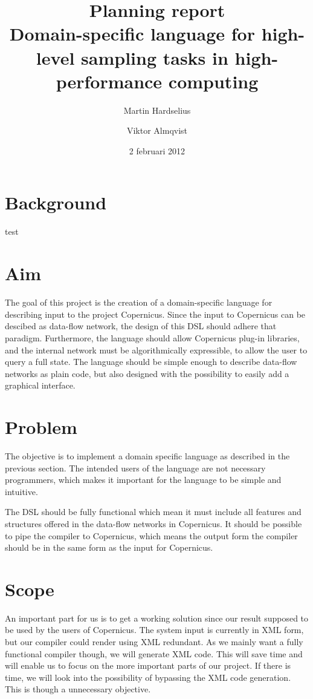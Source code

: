 \documentclass[a4paper]{article}
\title{Planning report\\
  \large{Domain-specific language for high-level
  sampling tasks in high-performance computing
  }
}
\author{Martin Hardselius \and Viktor Almqvist}
\date{2 februari 2012}
\begin{document}
\maketitle
\newpage

\section{Background}

test

\section{Aim}
The goal of this project is the creation of a domain-specific language
for describing input to the project Copernicus. Since the input to
Copernicus can be descibed as data-flow network, the design of this
DSL should adhere that paradigm. Furthermore, the language should
allow Copernicus plug-in libraries, and the internal network must be
algorithmically expressible, to allow the user to query a full
state. The language should be simple enough to describe data-flow
networks as plain code, but also designed with the possibility to
easily add a graphical interface.

\section{Problem}

The objective is to implement a domain specific language as described
in the previous section. The intended users of the language are not
necessary programmers, which makes it important for the language to be
simple and intuitive.

The DSL should be fully functional which mean it must include all
features and structures offered in the data-flow networks in
Copernicus. It should be possible to pipe the compiler to Copernicus,
which means the output form the compiler should be in the same form as
the input for Copernicus.


\section{Scope}

An important part for us is to get a working solution since our result
supposed to be used by the users of Copernicus. The system input is
currently in XML form, but our compiler could render using XML
redundant. As we mainly want a fully functional compiler though, we
will generate XML code. This will save time and will enable us to
focus on the more important parts of our project. If there is time, we
will look into the possibility of bypassing the XML code
generation. This is though a unnecessary objective.
\end{document}
